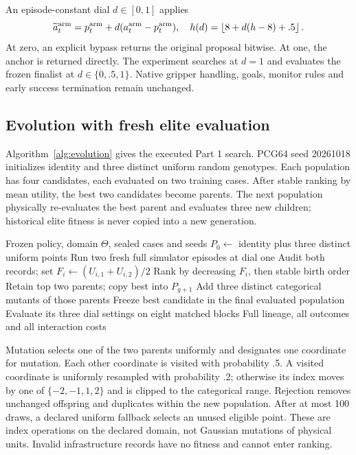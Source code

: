 \documentclass[sigconf,dvipsnames]{acmart}
\begin{document}
An episode-constant dial $d\in[0,1]$ applies
\begin{equation}
 \widetilde a_t^{\rm arm}=p_t^{\rm arm}+d(a_t^{\rm arm}-p_t^{\rm arm}),\quad
 h(d)=\left\lfloor8+d(h-8)+.5\right\rfloor.
\end{equation}
At zero, an explicit bypass returns the original proposal bitwise. At one, the
anchor is returned directly. The experiment searches at $d=1$ and evaluates the
frozen finalist at $d\in\{0,.5,1\}$. Native gripper handling, goals, monitor rules
and early success termination remain unchanged.

\subsection{Evolution with fresh elite evaluation}
Algorithm~\ref{alg:evolution} gives the executed Part 1 search. PCG64 seed 20261018
initializes identity and three distinct uniform random genotypes. Each population
has four candidates, each evaluated on two training cases. After stable ranking
by mean utility, the best two candidates become parents. The next population
physically re-evaluates the best parent and evaluates three new children; historical
elite fitness is never copied into a new generation.

\begin{algorithm}[t]
\caption{Executed Part 1 evolutionary search}
\label{alg:evolution}
\begin{algorithmic}[1]
\Require Frozen policy, domain $\Theta$, sealed cases and seeds
\State $P_0\gets$ identity plus three distinct uniform points
    \State Run two fresh full simulator episodes at dial one
    \State Audit both records; set $F_i\gets(U_{i,1}+U_{i,2})/2$
  \EndFor
  \State Rank by decreasing $F_i$, then stable birth order
    \State Retain top two parents; copy best into $P_{g+1}$
    \State Add three distinct categorical mutants of those parents
  \EndIf
\EndFor
\State Freeze best candidate in the final evaluated population
\State Evaluate its three dial settings on eight matched blocks
\Ensure Full lineage, all outcomes and all interaction costs
\end{algorithmic}
\end{algorithm}

Mutation selects one of the two parents uniformly and designates one coordinate
for mutation. Each other coordinate is visited with probability .5. A visited
coordinate is uniformly resampled with probability .2; otherwise its index moves
by one of $\{-2,-1,1,2\}$ and is clipped to the categorical range. Rejection removes
unchanged offspring and duplicates within the new population. After at most 100
draws, a declared uniform fallback selects an unused eligible point. These are
index operations on the declared domain, not Gaussian mutations of physical units.
Invalid infrastructure records have no fitness and cannot enter ranking.
\end{document}
